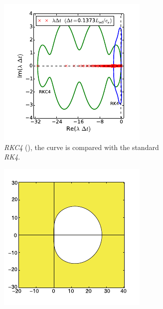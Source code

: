 \documentclass[final]{jpp}
\begin{document}
\begin{figure}
\begin{subfigure}{0.30 \textwidth}
\includegraphics[width=\textwidth]{rkc4-stability.pdf}
\caption{\textit{RKC4} (\cite{doerk}), the curve is compared with the standard \textit{RK4}.}
\label{fig:rkc4-stability}
\end{subfigure}
\hspace{0.02\textwidth}
\begin{subfigure}{0.30 \textwidth}
\includegraphics[width=\textwidth]{imex-imrk-stability.pdf}

\end{subfigure}
\end{figure}
\end{document}
